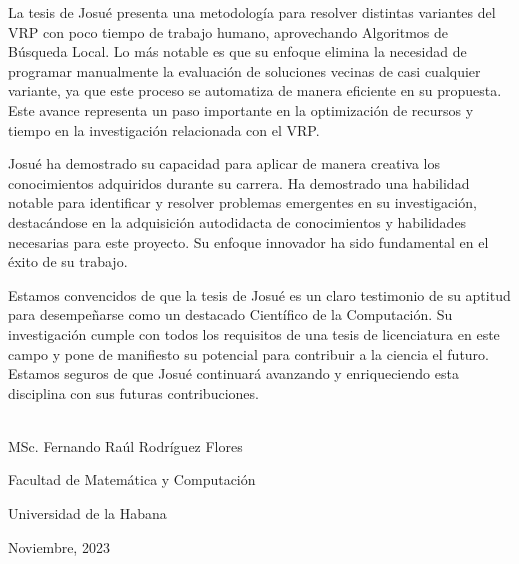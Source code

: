 \begin{opinion}	

La tesis de Josué presenta una metodología para resolver distintas variantes del VRP con poco tiempo de trabajo humano, aprovechando Algoritmos de Búsqueda Local. Lo más notable es que su enfoque elimina la necesidad de programar manualmente la evaluación de soluciones vecinas de casi cualquier variante, ya que este proceso se automatiza de manera eficiente en su propuesta. Este avance representa un paso importante en la optimización de recursos y tiempo en la investigación relacionada con el VRP.

Josué ha demostrado su capacidad para aplicar de manera creativa los conocimientos adquiridos durante su carrera. Ha demostrado una habilidad notable para identificar y resolver problemas emergentes en su investigación, destacándose en la adquisición autodidacta de conocimientos y habilidades necesarias para este proyecto. Su enfoque innovador ha sido fundamental en el éxito de su trabajo.

Estamos convencidos de que la tesis de Josué es un claro testimonio de su aptitud para desempeñarse como un destacado Científico de la Computación. Su investigación cumple con todos los requisitos de una tesis de licenciatura en este campo y pone de manifiesto su potencial para contribuir a la ciencia el futuro. Estamos seguros de que Josué continuará avanzando y enriqueciendo esta disciplina con sus futuras contribuciones.

\vspace{1cm}


\begin{flushright}
	\underline{\hspace{6.5cm}}\\
	MSc. Fernando Raúl Rodríguez Flores
	
	Facultad de Matemática y Computación
	
	Universidad de la Habana
	
	Noviembre, 2023
\end{flushright}

\end{opinion}